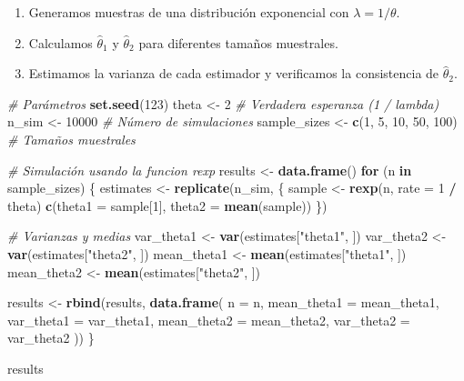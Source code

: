 \documentclass[
]{article}
\newenvironment{Shaded}{\begin{snugshade}}{\end{snugshade}}
\newcommand{\AttributeTok}[1]{\textcolor[rgb]{0.13,0.29,0.53}{#1}}
\newcommand{\CommentTok}[1]{\textcolor[rgb]{0.56,0.35,0.01}{\textit{#1}}}
\newcommand{\ControlFlowTok}[1]{\textcolor[rgb]{0.13,0.29,0.53}{\textbf{#1}}}
\newcommand{\DecValTok}[1]{\textcolor[rgb]{0.00,0.00,0.81}{#1}}
\newcommand{\FunctionTok}[1]{\textcolor[rgb]{0.13,0.29,0.53}{\textbf{#1}}}
\newcommand{\NormalTok}[1]{#1}
\newcommand{\OtherTok}[1]{\textcolor[rgb]{0.56,0.35,0.01}{#1}}
\newcommand{\SpecialCharTok}[1]{\textcolor[rgb]{0.81,0.36,0.00}{\textbf{#1}}}
\newcommand{\StringTok}[1]{\textcolor[rgb]{0.31,0.60,0.02}{#1}}
\providecommand{\tightlist}{%
  \setlength{\itemsep}{0pt}\setlength{\parskip}{0pt}}
\begin{document}
\begin{enumerate}
\def\labelenumi{\arabic{enumi}.}
\tightlist
\item
  Generamos muestras de una distribución exponencial con \(\lambda = 1/\theta\).
\item
  Calculamos \(\hat\theta_1\) y \(\hat\theta_2\) para diferentes tamaños muestrales.
\item
  Estimamos la varianza de cada estimador y verificamos la consistencia de \(\hat\theta_2\).
\end{enumerate}

\begin{Shaded}
\begin{Highlighting}[]
\CommentTok{\# Parámetros}
\FunctionTok{set.seed}\NormalTok{(}\DecValTok{123}\NormalTok{)}
\NormalTok{theta }\OtherTok{\textless{}{-}} \DecValTok{2}   \CommentTok{\# Verdadera esperanza (1 / lambda)}
\NormalTok{n\_sim }\OtherTok{\textless{}{-}} \DecValTok{10000} \CommentTok{\# Número de simulaciones}
\NormalTok{sample\_sizes }\OtherTok{\textless{}{-}} \FunctionTok{c}\NormalTok{(}\DecValTok{1}\NormalTok{, }\DecValTok{5}\NormalTok{, }\DecValTok{10}\NormalTok{, }\DecValTok{50}\NormalTok{, }\DecValTok{100}\NormalTok{) }\CommentTok{\# Tamaños muestrales}

\CommentTok{\# Simulación usando la funcion rexp}
\NormalTok{results }\OtherTok{\textless{}{-}} \FunctionTok{data.frame}\NormalTok{()}
\ControlFlowTok{for}\NormalTok{ (n }\ControlFlowTok{in}\NormalTok{ sample\_sizes) \{}
\NormalTok{  estimates }\OtherTok{\textless{}{-}} \FunctionTok{replicate}\NormalTok{(n\_sim, \{}
\NormalTok{    sample }\OtherTok{\textless{}{-}} \FunctionTok{rexp}\NormalTok{(n, }\AttributeTok{rate =} \DecValTok{1} \SpecialCharTok{/}\NormalTok{ theta)}
    \FunctionTok{c}\NormalTok{(}\AttributeTok{theta1 =}\NormalTok{ sample[}\DecValTok{1}\NormalTok{], }\AttributeTok{theta2 =} \FunctionTok{mean}\NormalTok{(sample))}
\NormalTok{  \})}
  
  \CommentTok{\# Varianzas y medias}
\NormalTok{  var\_theta1 }\OtherTok{\textless{}{-}} \FunctionTok{var}\NormalTok{(estimates[}\StringTok{"theta1"}\NormalTok{, ])}
\NormalTok{  var\_theta2 }\OtherTok{\textless{}{-}} \FunctionTok{var}\NormalTok{(estimates[}\StringTok{"theta2"}\NormalTok{, ])}
\NormalTok{  mean\_theta1 }\OtherTok{\textless{}{-}} \FunctionTok{mean}\NormalTok{(estimates[}\StringTok{"theta1"}\NormalTok{, ])}
\NormalTok{  mean\_theta2 }\OtherTok{\textless{}{-}} \FunctionTok{mean}\NormalTok{(estimates[}\StringTok{"theta2"}\NormalTok{, ])}
  
\NormalTok{  results }\OtherTok{\textless{}{-}} \FunctionTok{rbind}\NormalTok{(results, }\FunctionTok{data.frame}\NormalTok{(}
    \AttributeTok{n =}\NormalTok{ n,}
    \AttributeTok{mean\_theta1 =}\NormalTok{ mean\_theta1,}
    \AttributeTok{var\_theta1 =}\NormalTok{ var\_theta1,}
    \AttributeTok{mean\_theta2 =}\NormalTok{ mean\_theta2,}
    \AttributeTok{var\_theta2 =}\NormalTok{ var\_theta2}
\NormalTok{  ))}
\NormalTok{\}}

\NormalTok{results}
\end{Highlighting}
\end{Shaded}
\end{document}
